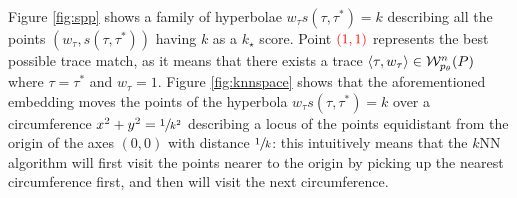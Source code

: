 \begin{example}
	Figure \ref{fig:spp} shows a family of hyperbolae $w_\tau s(\tau,\tau^*)=k$ describing all the points $(w_\tau, s(\tau,\tau^*))$ having $k$ as a $k_\star$ score. Point $\color{red}(1,1)$ represents the best possible trace match, as it means that there exists a trace $\braket{\tau,w_\tau}\in\mathcal{W}_{p_\theta}^n(P)$ where $\tau=\tau^*$ and $w_\tau=1$.
		Figure \ref{fig:knnspace} shows that the aforementioned embedding moves the points of the hyperbola $w_\tau s(\tau,\tau^*)=k$ over a circumference $x^2+y^2=\sfrac{1}{k^2}$ describing a locus of the points equidistant from the origin of the axes $(0,0)$ with distance $\sfrac{1}{k}$: this intuitively means that the $k$NN algorithm will first visit the points nearer to the origin by picking up the nearest circumference first, and then will visit the next circumference.
\end{example}


